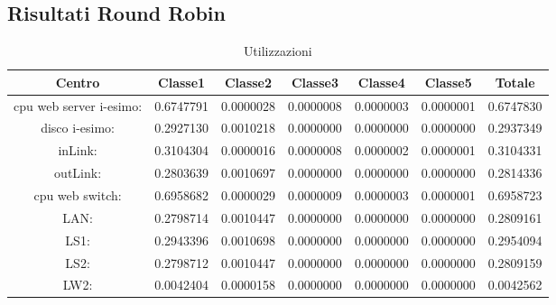 \subsection{Risultati Round Robin}
\begin{table}[H]
\begin{center}\begin{scriptsize}
\begin{tabular}{||c|c|c|c|c|c|c||}
\hline
Centro &Classe1 &Classe2 &Classe3 &Classe4 &Classe5 &Totale\\
\hline
\hline
 cpu web server i-esimo: 	&0.6747791	&0.0000028	&0.0000008	&0.0000003	&0.0000001	&0.6747830\\
\hline
 disco i-esimo: 	&0.2927130	&0.0010218	&0.0000000	&0.0000000	&0.0000000	&0.2937349\\
\hline
 inLink: 	&0.3104304	&0.0000016	&0.0000008	&0.0000002	&0.0000001	&0.3104331\\
\hline
 outLink: 	&0.2803639	&0.0010697	&0.0000000	&0.0000000	&0.0000000	&0.2814336\\
\hline
 cpu web switch: 	&0.6958682	&0.0000029	&0.0000009	&0.0000003	&0.0000001	&0.6958723\\
\hline
 LAN: 	&0.2798714	&0.0010447	&0.0000000	&0.0000000	&0.0000000	&0.2809161\\
\hline
 LS1: 	&0.2943396	&0.0010698	&0.0000000	&0.0000000	&0.0000000	&0.2954094\\
\hline
 LS2:	&0.2798712	&0.0010447	&0.0000000	&0.0000000	&0.0000000	&0.2809159\\
\hline
 LW2: 	&0.0042404	&0.0000158	&0.0000000	&0.0000000	&0.0000000	&0.0042562\\
\hline
\end{tabular}
\end{scriptsize}\end{center}
\caption{Utilizzazioni}
\label{utilizzazioni}
\end{table}

